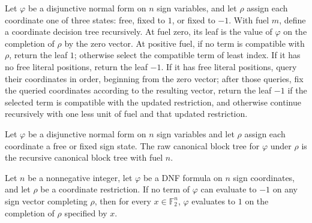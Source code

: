 \begin{definition}
\label{FABL.DNFFormula.canonicalBlockTreeAux}
\leanok
{}
Let $\varphi$ be a disjunctive normal form on $n$ sign variables, and let $\rho$ assign
each coordinate one of three states: free, fixed to $1$, or fixed to $-1$. With fuel
$m$, define a coordinate decision tree recursively. At fuel zero, its leaf is the value
of $\varphi$ on the completion of $\rho$ by the zero vector. At positive fuel, if no
term is compatible with $\rho$, return the leaf $1$; otherwise select the compatible
term of least index. If it has no free literal positions, return the leaf $-1$. If it
has free literal positions, query their coordinates in order, beginning from the zero
vector; after those queries, fix the queried coordinates according to the resulting
vector, return the leaf $-1$ if the selected term is compatible with the updated
restriction, and otherwise continue recursively with one less unit of fuel and that
updated restriction.
\end{definition}

\begin{definition}
\label{FABL.DNFFormula.canonicalBlockTreeRaw}
\leanok
{}
Let $\varphi$ be a disjunctive normal form on $n$ sign variables and let $\rho$ assign
each coordinate a free or fixed sign state. The raw canonical block tree for $\varphi$
under $\rho$ is the recursive canonical block tree with fuel $n$.
\end{definition}

\begin{theorem}
\label{FABL.DNFFormula.eval_eq_one_of_no_compatible}
\leanok
{}
Let $n$ be a nonnegative integer, let $\varphi$ be a DNF formula on $n$ sign
coordinates, and let $\rho$ be a coordinate restriction. If no term of $\varphi$ can
evaluate to $-1$ on any sign vector completing $\rho$, then for every $x\in\mathbb
F_2^n$, $\varphi$ evaluates to $1$ on the completion of $\rho$ specified by $x$.
\end{theorem}

